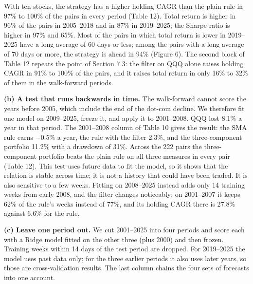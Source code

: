 \documentclass[11pt]{article}
\begin{document}
With ten stocks, the strategy has a higher holding CAGR than the plain rule in 97\% to 100\% of the pairs in every period (Table 12). Total return is higher in 96\% of the pairs in 2005--2018 and in 87\% in 2019--2025; the Sharpe ratio is higher in 97\% and 65\%. Most of the pairs in which total return is lower in 2019--2025 have a long average of 60 days or less; among the pairs with a long average of 70 days or more, the strategy is ahead in 94\% (Figure 6). The second block of Table 12 repeats the point of Section 7.3: the filter on QQQ alone raises holding CAGR in 91\% to 100\% of the pairs, and it raises total return in only 16\% to 32\% of them in the walk-forward periods.

\textbf{(b) A test that runs backwards in time.} The walk-forward cannot score the years before 2005, which include the end of the dot-com decline. We therefore fit one model on 2009--2025, freeze it, and apply it to 2001--2008. QQQ lost 8.1\% a year in that period. The 2001--2008 column of Table 10 gives the result: the SMA rule earns $-$0.5\% a year, the rule with the filter 2.3\%, and the three-component portfolio 11.2\% with a drawdown of 31\%. Across the 222 pairs the three-component portfolio beats the plain rule on all three measures in every pair (Table 12). This test uses future data to fit the model, so it shows that the relation is stable across time; it is not a history that could have been traded. It is also sensitive to a few weeks. Fitting on 2008--2025 instead adds only 14 training weeks from early 2008, and the filter changes noticeably: on 2001--2007 it keeps 62\% of the rule's weeks instead of 77\%, and its holding CAGR there is 27.8\% against 6.6\% for the rule.

\textbf{(c) Leave one period out.} We cut 2001--2025 into four periods and score each with a Ridge model fitted on the other three (plus 2000) and then frozen. Training weeks within 14 days of the test period are dropped. For 2019--2025 the model uses past data only; for the three earlier periods it also uses later years, so those are cross-validation results. The last column chains the four sets of forecasts into one account.
\end{document}
